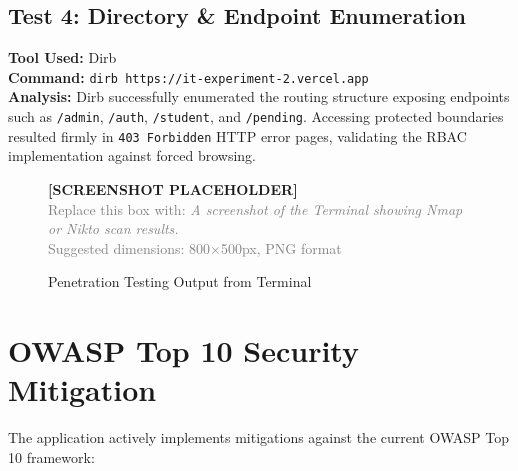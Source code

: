 \documentclass[12pt,a4paper]{report}
\begin{document}
\section{Test 4: Directory \& Endpoint Enumeration}
\textbf{Tool Used:} Dirb \\
\textbf{Command:} \texttt{dirb https://it-experiment-2.vercel.app} \\
\textbf{Analysis:} Dirb successfully enumerated the routing structure exposing endpoints such as \texttt{/admin}, \texttt{/auth}, \texttt{/student}, and \texttt{/pending}. Accessing protected boundaries resulted firmly in \texttt{403 Forbidden} HTTP error pages, validating the RBAC implementation against forced browsing.

\begin{figure}[H]
  \centering
  \begin{mdframed}[backgroundcolor=lightgray, linecolor=accentblue, linewidth=1.5pt]
    \centering
    \vspace{1.5cm}
    \textbf{\large [SCREENSHOT PLACEHOLDER]}\\[0.5em]
    \textcolor{gray}{Replace this box with: \textit{A screenshot of the Terminal showing Nmap or Nikto scan results.}}\\[0.3em]
    \textcolor{gray}{Suggested dimensions: 800×500px, PNG format}
    \vspace{1.5cm}
  \end{mdframed}
  \caption{Penetration Testing Output from Terminal}
  \label{fig:pentest_results}
\end{figure}


\chapter{OWASP Top 10 Security Mitigation}
The application actively implements mitigations against the current OWASP Top 10 framework:
\end{document}
